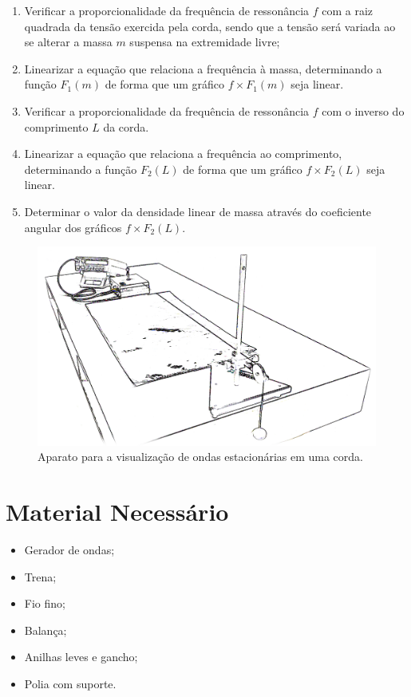\begin{enumerate}
	\item Verificar a proporcionalidade da frequência de ressonância $f$ com a raiz quadrada da tensão exercida pela corda, sendo que a tensão será variada ao se alterar a massa $m$ suspensa na extremidade livre;
	\item Linearizar a equação que relaciona a frequência à massa, determinando a função $F_1(m)$ de forma que um gráfico $f \times F_1(m)$ seja linear.
	\item Verificar a proporcionalidade da frequência de ressonância $f$ com o inverso do comprimento $L$ da corda.
	\item Linearizar a equação que relaciona a frequência ao comprimento, determinando a função $F_2(L)$ de forma que um gráfico $f \times F_2(L)$ seja linear.
	\item Determinar o valor da densidade linear de massa através do coeficiente angular dos gráficos $f \times F_2(L)$.
\end{enumerate}

\begin{figure}\forcerectofloat
	\centering
	\includegraphics[width=\textwidth]{Ilustrations/Ondas_estacionarias.png}
	\caption{Aparato para a visualização de ondas estacionárias em uma corda.}
\end{figure}

\section{Material Necessário}

\begin{itemize}
	\item Gerador de ondas;
	\item Trena;
	\item Fio fino;
	\item Balança;
	\item Anilhas leves e gancho;
	\item Polia com suporte.
\end{itemize}

